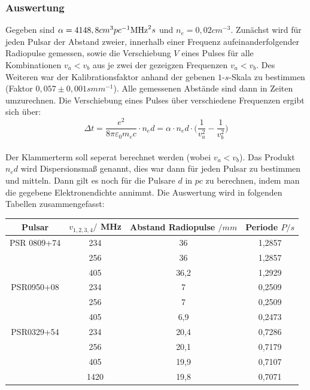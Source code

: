 \documentclass[12pt]{article}
\begin{document}
\subsubsection*{Auswertung}
Gegeben sind $\alpha = 4148,8 cm^3 pc^{-1}\textnormal{MHz}^2s$ und $n_e = 0,02cm^{-3}$. Zunächst wird für jeden Pulsar der Abstand zweier, innerhalb einer Frequenz aufeinanderfolgender Radiopulse gemessen, sowie die Verschiebung $V$ eines Pulses für alle Kombinationen $v_a < v_b$ aus je zwei der gezeigzen Frequenzen $v_a < v_b$. Des Weiteren war der Kalibrationsfaktor anhand der gebenen $1$-$s$-Skala zu bestimmen (Faktor $0,057\pm 0,001 s mm^{-1}$). Alle gemessenen Abstände sind dann in Zeiten umzurechnen. Die Verschiebung eines Pulses über verschiedene Frequenzen ergibt sich über:
\[\Delta t = \frac{e^2}{8 \pi \varepsilon_0 m_e c}\cdot n_e d = \alpha \cdot n_e d\cdot \Biggl(\frac{1}{v^2_a}-\frac{1}{v^2_b}\Biggr)\]\\
Der Klammerterm soll seperat berechnet werden (wobei $v_a < v_b$). Das Produkt $n_e d$ wird Dispersionsmaß genannt, dies war dann für jeden Pulsar zu bestimmen und mitteln. Dann gilt es noch für die Pulsare $d$ in $pc$ zu berechnen, indem man die gegebene Elektronendichte annimmt. 
Die Auswertung wird in folgenden Tabellen zusammengefasst:
\begin{table}[!ht]
    \centering
    \begin{tabular}{c|c|c|c}
        Pulsar & $v_{1,2,3,4} /$ MHz & Abstand Radiopulse $/mm$ & Periode $P/s$ \\ \hline
        PSR 0809+74 & 234 & 36 & 1,2857 \\ 
        ~ & 256 & 36 & 1,2857 \\ 
        ~ & 405 & 36,2 & 1,2929 \\\hline 
        PSR0950+08 & 234 & 7 & 0,2509 \\ 
        ~ & 256 & 7 & 0,2509 \\ 
        ~ & 405 & 6,9 & 0,2473 \\ \hline
        PSR0329+54 & 234 & 20,4 & 0,7286 \\ 
        ~ & 256 & 20,1 & 0,7179 \\ 
        ~ & 405 & 19,9 & 0,7107 \\ 
        ~ & 1420 & 19,8 & 0,7071 \\ 
    \end{tabular}
\end{table}\\
\end{document}
